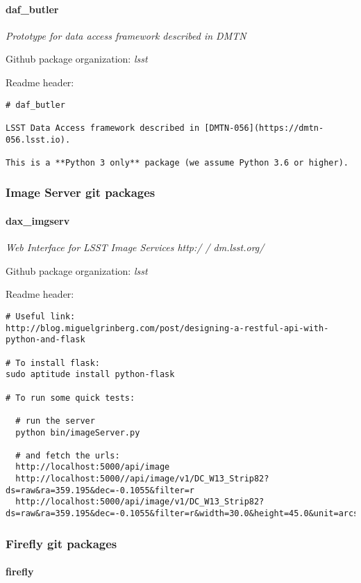 \paragraph{daf\_butler}
\textit{Prototype for data access framework described in DMTN}

Github package organization: \textit{lsst}

Readme header:

\begin{verbatim}
# daf_butler

LSST Data Access framework described in [DMTN-056](https://dmtn-056.lsst.io).

This is a **Python 3 only** package (we assume Python 3.6 or higher).\end{verbatim}

\subsubsection{Image Server git packages}
\paragraph{dax\_imgserv}
\textit{Web Interface for LSST Image Services http:/ / dm.lsst.org/ }

Github package organization: \textit{lsst}

Readme header:

\begin{verbatim}
# Useful link:
http://blog.miguelgrinberg.com/post/designing-a-restful-api-with-python-and-flask

# To install flask:
sudo aptitude install python-flask

# To run some quick tests:

  # run the server
  python bin/imageServer.py

  # and fetch the urls:
  http://localhost:5000/api/image
  http://localhost:5000//api/image/v1/DC_W13_Strip82?ds=raw&ra=359.195&dec=-0.1055&filter=r
  http://localhost:5000/api/image/v1/DC_W13_Strip82?ds=raw&ra=359.195&dec=-0.1055&filter=r&width=30.0&height=45.0&unit=arcsec\end{verbatim}

\subsubsection{Firefly git packages}
\paragraph{firefly}
\textit{}

